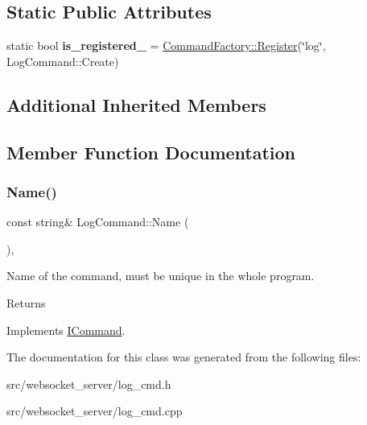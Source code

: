 \subsection*{Static Public Attributes}
\begin{DoxyCompactItemize}
\item 
\mbox{\label{classLogCommand_a492977195c70debf93aa962c69855db8}} 
static bool {\bfseries is\+\_\+registered\+\_\+} = \hyperlink{classCommandFactory_a0a17b908385bd5087bd1cb45ae6b0639}{Command\+Factory\+::\+Register}(\char`\"{}log\char`\"{}, Log\+Command\+::\+Create)
\end{DoxyCompactItemize}
\subsection*{Additional Inherited Members}


\subsection{Member Function Documentation}
\mbox{\label{classLogCommand_aba05f5a8920ce0526d22ecfd93ea5060}} 
\subsubsection{\texorpdfstring{Name()}{Name()}}
{\footnotesize\ttfamily const string\& Log\+Command\+::\+Name (\begin{DoxyParamCaption}{ }\end{DoxyParamCaption})\hspace{0.3cm}{\ttfamily [override]}, {\ttfamily [virtual]}}



Name of the command, must be unique in the whole program. 

\begin{DoxyReturn}{Returns}

\end{DoxyReturn}


Implements \hyperlink{classICommand_aebdd4993acbba78855f1ace503786dfc}{I\+Command}.



The documentation for this class was generated from the following files\+:\begin{DoxyCompactItemize}
\item 
src/websocket\+\_\+server/log\+\_\+cmd.\+h\item 
src/websocket\+\_\+server/log\+\_\+cmd.\+cpp\end{DoxyCompactItemize}
